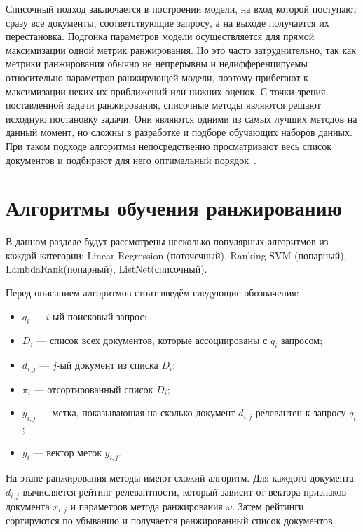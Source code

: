 Списочный подход заключается в построении модели, на вход которой поступают сразу все документы, соответствующие запросу, а на выходе получается их перестановка. Подгонка параметров модели осуществляется для прямой максимизации одной метрик ранжирования. Но это часто затруднительно, так как метрики ранжирования обычно не непрерывны и недифференцируемы относительно параметров ранжирующей модели, поэтому прибегают к максимизации неких их приближений или нижних оценок. С точки зрения поставленной задачи ранжирования, списочные методы являются  решают исходную постановку задачи. Они являются одними из самых лучших методов на данный момент, но  сложны в разработке и подборе обучающих наборов данных. При таком подходе алгоритмы непосредственно просматривают весь список документов и подбирают для него оптимальный порядок~\cite{LR_BOOK}.

\section{Алгоритмы обучения ранжированию}

В данном разделе будут рассмотрены несколько популярных алгоритмов из каждой категории: Linear Regression (поточечный), Ranking SVM (попарный), LambdaRank(попарный), ListNet(списочный). 

Перед описанием алгоритмов стоит введём следующие обозначения:
\begin{itemize}[label=---]
	\item $q_{i}$ --- $i$-ый поисковый запрос;
	\item $D_{i}$ --- список всех документов, которые ассоциированы с $q_{i}$ запросом;
	\item $d_{i,j}$ --- $j$-ый документ из списка $D_{i}$;
	\item $\pi_{i}$ --- отсортированный список $D_{i}$;
	\item $y_{i,j}$ --- метка, показывающая на сколько документ $d_{i,j}$ релевантен к запросу $q_{i}$;
	\item $y_{i}$ --- вектор меток $y_{i,j}$.
\end{itemize}

На этапе ранжирования методы имеют схожий алгоритм. Для каждого документа $d_{i,j}$ вычисляется рейтинг релевантности, который зависит от вектора признаков документа $x_{i,j}$ и параметров метода ранжирования $\omega$. Затем рейтинги сортируются по убыванию и получается ранжированный список документов.  

